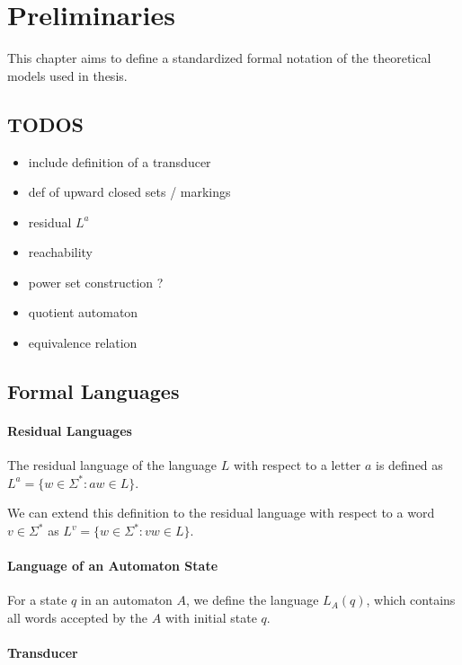 \chapter{Preliminaries}\label{chapter:preliminaries}
This chapter aims to define a standardized formal notation of the theoretical models used in thesis.

\section{TODOS}
\begin{itemize}
\item include definition of a transducer 
\item def of upward closed sets / markings
\item residual $L^{a}$
\item reachability
\item power set construction ?
\item quotient automaton
\item equivalence relation

\end{itemize}

\section{Formal Languages}

\subsubsection{Residual Languages}

The residual language of the language $L$ with respect to a letter $a$ is defined as \break
$L^{a} = \{ w \in \Sigma^{*} : aw \in L \}$.

We can extend this definition to the residual language with respect to a word $v \in \Sigma^{*}$ as \break
$L^{v} = \{ w \in \Sigma^{*} : vw \in L \}$.

\subsubsection{Language of an Automaton State}

For a state $q$ in an automaton $A$, we define the language $L_{A}(q)$, which contains all words accepted by the $A$ with initial state $q$.

\subsubsection{Transducer}

